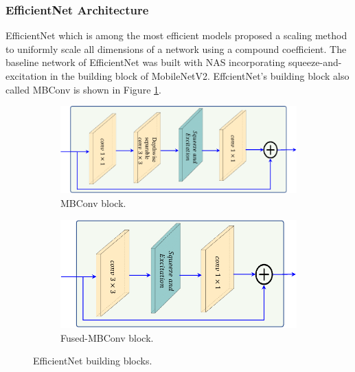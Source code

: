 \subsubsection{EfficientNet Architecture}
EfficientNet \cite{efficientNetRef} which is among the most efficient models proposed a scaling method to uniformly scale all dimensions of a network using a compound coefficient. The baseline network of EfficientNet was built with NAS incorporating squeeze-and-excitation in the building block of MobileNetV2. EffcientNet’s building block also called MBConv is shown in Figure \ref{fig:MBConv}.
\begin{figure}[htb!]
	\centering
	\begin{subfigure}[b]{\textwidth}
		\centering
		\includegraphics[width=\textwidth,keepaspectratio]{images/pretraining/MBConv-cropped.pdf}
		\caption{MBConv block.}
		\label{fig:MBConv}
	\end{subfigure}
	\hfill
	\begin{subfigure}[b]{0.75\textwidth}
		\centering
		\includegraphics[width=\textwidth,keepaspectratio]{images/pretraining/FusedMBConv-cropped.pdf}
		\caption{Fused-MBConv block.}
		\label{fig:Fused-MBConv}
	\end{subfigure}
	
	\caption{EfficientNet building blocks.}
	\label{fig:mobilenet-blocks}
\end{figure}
